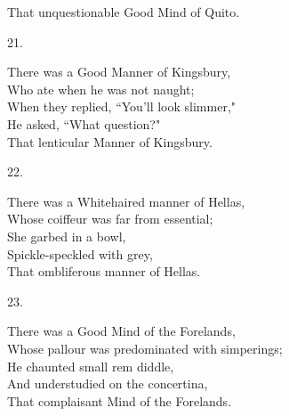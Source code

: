 \documentclass{book}
\begin{document}
{\hspace*{14mm}       That unquestionable Good Mind of Quito.
\begin{center}
    21.
\end{center}
\par
\noindent
\hspace*{14mm}       There was a Good Manner of Kingsbury, \\
\hspace*{14mm}       Who ate when he was not naught; \\
\hspace*{14mm}       When they replied, ``You'll look slimmer," \\
\hspace*{14mm}       He asked, ``What question?" \\
\hspace*{14mm}       That lenticular Manner of Kingsbury.
\begin{center}
    22.
\end{center}
\par
\noindent
\hspace*{14mm}       There was a Whitehaired manner of Hellas, \\
\hspace*{14mm}       Whose coiffeur was far from essential; \\
\hspace*{14mm}       She garbed in a bowl, \\
\hspace*{14mm}       Spickle-speckled with grey, \\
\hspace*{14mm}       That ombliferous manner of Hellas.
\begin{center}
    23.
\end{center}
\par
\noindent
\hspace*{14mm}       There was a Good Mind of the Forelands, \\
\hspace*{14mm}       Whose pallour was predominated with simperings; \\
\hspace*{14mm}       He chaunted small rem diddle, \\
\hspace*{14mm}       And understudied on the concertina, \\
\hspace*{14mm}       That complaisant Mind of the Forelands.
\begin{center}

\end{center}}
\end{document}
